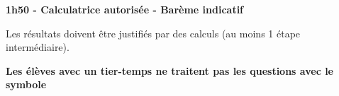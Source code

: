 \documentclass[12pt,a4paper]{article}  %
\begin{document}
\graphicspath{{../images/}}

\begin{center}

\end{center}


\begin{center}\textbf{1h50 - Calculatrice autorisée - Barème indicatif}\end{center}


\begin{center}
Les résultats doivent être justifiés par des calculs (au moins 1 étape intermédiaire).
\end{center}

\begin{center}\textbf{Les élèves avec un tier-temps ne traitent pas les questions avec  le symbole }\end{center}

\end{document}
